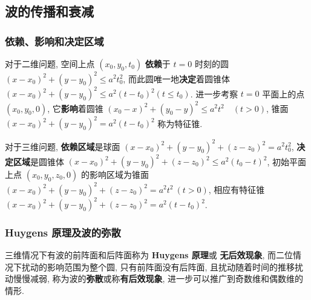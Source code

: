\documentclass[10pt]{yerbaformat}
\begin{document}
\subsection{波的传播和衰减}

\subsubsection{依赖、影响和决定区域}
\par 对于二维问题, 空间上点 $\left(x_{0}, y_{0}, t_{0}\right)$ \textbf{依赖}于 $t=0$ 时刻的圆 $\left(x-x_{0}\right)^{2}+\left(y-y_{0}\right)^{2} \leqslant a^{2} t_{0}^{2}$, 而此圆唯一地\textbf{决定}着圆锥体 $\left(x-x_{0}\right)^{2}+\left(y-y_{0}\right)^{2} \leqslant a^{2}\left(t-t_{0}\right)^{2} \left(t \leqslant t_{0}\right)$. 进一步考察 $t=0$ 平面上的点 $\left(x_{0}, y_{0}, 0\right)$, 它\textbf{影响}着圆锥 $\left(x_{0}-x\right)^{2}+\left(y_{0}-y\right)^{2} \leqslant a^{2} t^{2} \quad(t>0)$, 锥面 $\left(x-x_{0}\right)^{2}+\left(y-y_{0}\right)^{2}=a^{2}\left(t-t_{0}\right)^{2}$ 称为特征锥.


\par 对于三维问题, \textbf{依赖区域}是球面 $\left(x-x_{0}\right)^{2}+\left(y-y_{0}\right)^{2}+\left(z-z_{0}\right)^{2}=a^{2} t_{0}^{2}$, \textbf{决定区域}是圆锥体 $\left(x-x_{0}\right)^{2}+\left(y-y_{0}\right)^{2}+\left(z-z_{0}\right)^{2} \leqslant a^{2}\left(t_{0}-t\right)^{2}$, 初始平面上点 $\left(x_{0}, y_{0}, z_{0}, 0\right)$ 的影响区域为锥面 $\left(x-x_{0}\right)^{2}+\left(y-y_{0}\right)^{2}+\left(z-z_{0}\right)^{2}=a^{2} t^{2} \ (t>0)$, 相应有特征锥 $\left(x-x_{0}\right)^{2}+\left(y-y_{0}\right)^{2}+\left(z-z_{0}\right)^{2}=a^{2}\left(t-t_{0}\right)^{2}$.

\subsubsection{Huygens 原理及波的弥散}

\par 三维情况下有波的前阵面和后阵面称为 \textbf{Huygens 原理}或 \textbf{无后效现象}, 而二位情况下扰动的影响范围为整个圆, 只有前阵面没有后阵面, 且扰动随着时间的推移扰动慢慢减弱, 称为波的\textbf{弥散}或称\textbf{有后效现象}, 进一步可以推广到奇数维和偶数维的情形.
\end{document}
